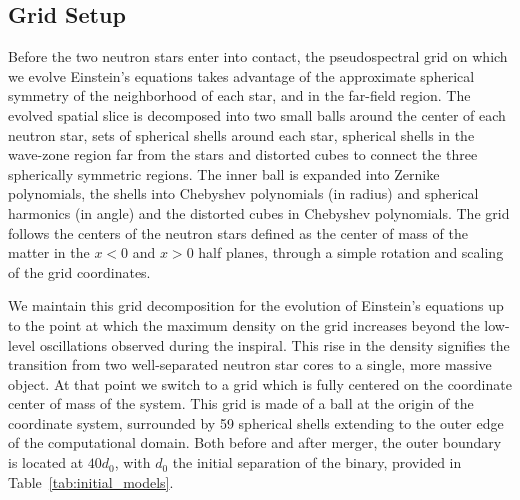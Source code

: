 \subsection{Grid Setup}

Before the two neutron stars enter into contact, the pseudospectral grid on which we evolve Einstein's equations takes advantage of the approximate spherical symmetry of the neighborhood of each star, and in the far-field region. The evolved spatial slice is decomposed into two small balls around the center of each neutron star, sets of spherical shells around each star, spherical shells in the wave-zone region far from the stars and distorted cubes to connect the three spherically symmetric regions. The inner ball is expanded into Zernike polynomials, the shells into Chebyshev polynomials (in radius) and spherical harmonics (in angle) and the distorted cubes in Chebyshev polynomials. The grid follows the centers of the neutron stars defined as the center of mass of the matter in the $x < 0$ and $x > 0$ half planes, through a simple rotation and scaling of the grid coordinates. %

We maintain this grid decomposition for the evolution of Einstein's equations up to the point at which the maximum density on the grid increases beyond the low-level oscillations observed during the inspiral. This rise in the density signifies the transition from two well-separated neutron star cores to a single, more massive object. At that point we switch to a grid which is fully centered on the coordinate center of mass of the system. This grid  is made of a ball at the origin of the coordinate system, surrounded by 59 spherical shells extending to the outer edge of the computational domain. Both before and after merger, the outer boundary is located at $40d_0$, with $d_0$ the initial separation of the binary, provided in Table~\ref{tab:initial_models}.


